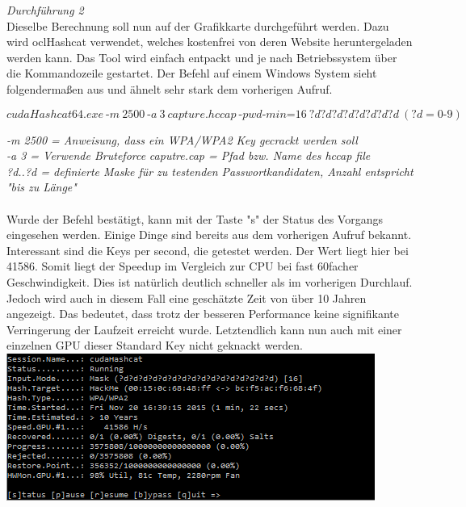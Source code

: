 \textit{Durchführung 2}\\

Dieselbe Berechnung soll nun auf der Grafikkarte durchgeführt werden. Dazu wird oclHashcat verwendet, welches kostenfrei von deren Website heruntergeladen werden kann. Das Tool wird einfach entpackt und je nach Betriebssystem über die Kommandozeile gestartet. Der Befehl auf einem Windows System sieht folgendermaßen aus und ähnelt sehr stark dem vorherigen Aufruf.

$$cudaHashcat64.exe~\text{-}m~2500~\text{-}a~3~capture.hccap~\text{-}pwd\text{-}min\text{=}16~?d?d?d?d?d?d?d?d~(?d = 0\text{-}9)$$

\textit{-m 2500 = Anweisung, dass ein WPA/WPA2 Key gecrackt werden soll}\\
\textit{-a 3 = Verwende Bruteforce}
\textit{caputre.cap = Pfad bzw. Name des hccap file}\\
\textit{?d..?d = definierte Maske für zu testenden Passwortkandidaten, Anzahl entspricht "bis zu Länge"\\}\\

Wurde der Befehl bestätigt, kann mit der Taste "s" der Status des Vorgangs eingesehen werden. Einige Dinge sind bereits aus dem vorherigen Aufruf bekannt. Interessant sind die Keys per second, die getestet werden. Der Wert liegt hier bei 41586. Somit liegt der Speedup im Vergleich zur CPU bei fast 60facher
Geschwindigkeit. Dies ist natürlich deutlich schneller als im vorherigen Durchlauf. Jedoch wird auch in diesem Fall eine geschätzte Zeit von über 10 Jahren angezeigt. Das bedeutet, dass trotz der besseren Performance keine signifikante Verringerung der Laufzeit erreicht wurde. 
Letztendlich kann nun auch mit einer einzelnen GPU dieser Standard Key nicht geknackt werden.\\

\includegraphics[width=\textwidth]{bilder/wlan/cudaHashcatNUMSeriesCrack.png}\\

